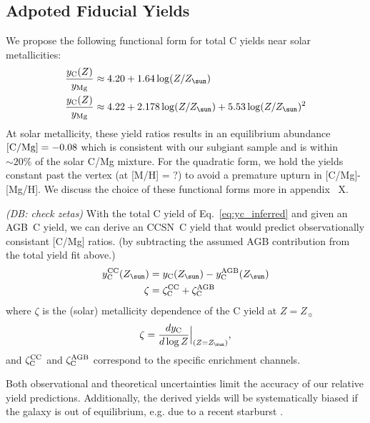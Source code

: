 \documentclass[fleqn,
usenatbib]{mnras}
\newcommand{\agb}{AGB}
\newcommand{\cc}{CCSN}
\newcommand{\caah}{[C/Mg]-[Mg/H]}
\newcommand{\Yct}{{y_{\rm C}}}
\newcommand{\Ycc}{{y_{\rm C}^{\rm CC}}}
\newcommand{\Ycagb}{{y_{\rm C}^{\rm AGB}}}
\newcommand{\zagb}{\zeta_{\rm C}^{\rm AGB}}
\newcommand{\zcc}{\zeta_{\rm C}^{\rm CC}}
\newcommand{\Zo}{ Z_{\sun}}
\newcommand{\about}[1]{${\sim} #1$}
\newcommand{\note}[1]{{\color{ForestGreen} \textit{ \small (JWJ: #1)}}}
\newcommand{\dbadd}[1]{{\color{Thistle} #1}}
\newcommand{\dbnote}[1]{ {\color{Thistle} \textit{\small (DB: #1)}} }
\begin{document}
\subsection{Adpoted Fiducial Yields}
We propose the following functional form for total C yields near solar metallicities:
\begin{subequations}\label{eq:yc_inferred}
    \begin{align}
        \frac{\Yct(Z)}{y_{\rm Mg}} &\approx 4.20 + 1.64 \log (Z/\Zo)\\
        \frac{\Yct(Z)}{y_{\rm Mg}} &\approx 4.22 + 2.178 \log(Z/\Zo) + 5.53 \log(Z/\Zo)^2
    \end{align}
\end{subequations}
At solar metallicity, these yield ratios results in an equilibrium abundance $[{\rm C/Mg}] = -0.08$ which is consistent with our subgiant sample and is within \about{20\%} of the solar C/Mg mixture. 
For the quadratic form, we hold the yields constant past the vertex (at {\color{red} [M/H] = ?}) to avoid a premature upturn in \caah.
We discuss the choice of these functional forms more in appendix~\dbadd{X}.



\dbnote{check zetas}
With the total C yield of Eq.~\ref{eq:yc_inferred} and given an \agb\ C yield, we can derive an \cc\ C yield that would predict observationally consistant [C/Mg] ratios.
(by subtracting the assumed AGB contribution from the total yield fit above.)
\begin{subequations}
    \begin{align}
        \Ycc(\Zo) &= \Yct(\Zo) - \Ycagb(\Zo)\\
        \zeta &= \zcc + \zagb
    \end{align}
\end{subequations}
where $\zeta$ is the (solar) metallicity dependence of the C yield at $Z=\Zo$
\begin{equation}
    \zeta = \frac{d y_{\rm C}}{d \log Z} \Big \vert_{(Z=\Zo)},
\end{equation}
and $\zcc$ and $\zagb$ correspond to the specific enrichment channels. 

Both observational and theoretical uncertainties limit the accuracy of our relative yield predictions. Additionally, the derived yields will be systematically biased if the galaxy is out of equilibrium, e.g. due to a recent starburst \citep{mor+19,isern19}. 
\end{document}
